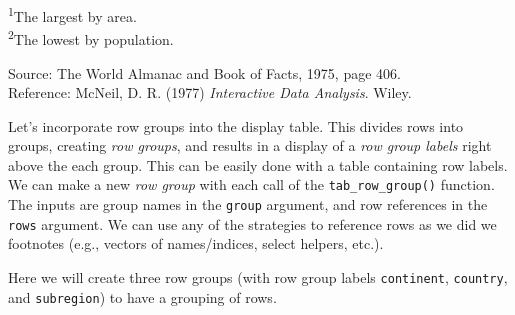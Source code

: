 \documentclass[]{article}
\newenvironment{Shaded}{\begin{snugshade}}{\end{snugshade}}
\newcommand{\KeywordTok}[1]{\textcolor[rgb]{0.13,0.29,0.53}{\textbf{#1}}}
\newcommand{\DataTypeTok}[1]{\textcolor[rgb]{0.13,0.29,0.53}{#1}}
\newcommand{\DecValTok}[1]{\textcolor[rgb]{0.00,0.00,0.81}{#1}}
\newcommand{\StringTok}[1]{\textcolor[rgb]{0.31,0.60,0.02}{#1}}
\newcommand{\CommentTok}[1]{\textcolor[rgb]{0.56,0.35,0.01}{\textit{#1}}}
\newcommand{\OperatorTok}[1]{\textcolor[rgb]{0.81,0.36,0.00}{\textbf{#1}}}
\newcommand{\NormalTok}[1]{#1}
\begin{document}
\vspace{-5mm}

\begin{minipage}{\linewidth}
\textsuperscript{1}The largest by area. \\ 
\textsuperscript{2}The lowest by population. \\ 
\end{minipage}\begin{minipage}{\linewidth}
Source: The World Almanac and Book of Facts, 1975, page 406.\\ 
Reference: McNeil, D. R. (1977) \emph{Interactive Data Analysis}. Wiley.\\ 
\end{minipage}

Let's incorporate row groups into the display table. This divides rows
into groups, creating \emph{row groups}, and results in a display of a
\emph{row group labels} right above the each group. This can be easily
done with a table containing row labels. We can make a new \emph{row
group} with each call of the \texttt{tab\_row\_group()} function. The
inputs are group names in the \texttt{group} argument, and row
references in the \texttt{rows} argument. We can use any of the
strategies to reference rows as we did we footnotes (e.g., vectors of
names/indices, select helpers, etc.).

Here we will create three row groups (with row group labels
\texttt{continent}, \texttt{country}, and \texttt{subregion}) to have a
grouping of rows.

\begin{Shaded}
\end{Shaded}
\end{document}

